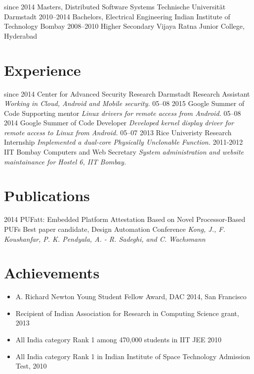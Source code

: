 \documentclass[]{friggeri-cv}
\begin{document}
\begin{entrylist}
  \entry
    {since 2014}
    {Masters, {\normalfont Distributed Software Systems}}
    {Technische Universität Darmstadt}
    {}%
  \entry
    {2010–2014}
    {Bachelors, {\normalfont Electrical Engineering}}
    {Indian Institute of Technology Bombay}
    {}%
  \entry
    {2008–2010}
    {Higher Secondary}
    {Vijaya Ratna Junior College, Hyderabad}
    {}%
\end{entrylist}

\section{Experience}

\begin{entrylist}
  \entry
    {since 2014}
    {Center for Advanced Security Research Darmstadt}
    {Research Assistant}
    {\emph{Working in Cloud, Android and Mobile security.}}
  \entry
    {05–08 2015}
    {Google Summer of Code}
    {Supporting mentor}
    {\emph{Linux drivers for remote access from Android.}}
  \entry
    {05–08 2014}
    {Google Summer of Code}
    {Developer}
    {\emph{Developed kernel display driver for remote access to Linux from Android.}}
  \entry
    {05–07 2013}
    {Rice Univeristy}
    {Research Internship}
    {\emph{Implemented a dual-core Physically Unclonable Function.}}
  \entry
    {2011-2012}
    {IIT Bombay}
    {Computers and Web Secretary}
    {\emph{System administration and website maintainance for Hostel 6, IIT Bombay.}}
\end{entrylist}

\section{Publications}
\begin{entrylist}
  \entry
    {2014}
    {PUFatt: Embedded Platform Attestation Based on Novel Processor-Based PUFs}
    {Best paper candidate, Design Automation Conference}
    {\emph{Kong, J., F. Koushanfar, P. K. Pendyala, A. - R. Sadeghi, and C. Wachsmann}}
\end{entrylist}

\section{Achievements}
\begin{itemize}
  \item A. Richard Newton Young Student Fellow Award, DAC 2014, San Francisco
  \item Recipient of Indian Association for Research in Computing Science grant, 2013
  \item All India category Rank 1 among 470,000 students in IIT JEE 2010
  \item All India category Rank 1 in Indian Institute of Space Technology Admission Test, 2010
\end{itemize}
~
\end{document}
